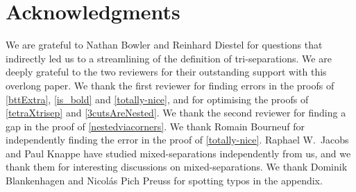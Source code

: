 \documentclass{aic}
\theoremstyle{plain}
\theoremstyle{definition}
\theoremstyle{plain}
\theoremstyle{plain}
\begin{document}
\section*{Acknowledgments} %
We are grateful to Nathan Bowler and Reinhard Diestel for questions that indirectly led us to a streamlining of the definition of tri-separations.
We are deeply grateful to the two reviewers for their outstanding support with this overlong paper.
We thank the first reviewer for finding errors in the proofs of \autoref{bttExtra}, \autoref{is_bold} and \autoref{totally-nice}, and for optimising the proofs of \autoref{tetraXtrisep} and \autoref{3cutsAreNested}.
We thank the second reviewer for finding a gap in the proof of \autoref{nestedviacorners}.
We thank Romain Bourneuf for independently finding the error in the proof of \autoref{totally-nice}.
Raphael W.~Jacobs and Paul Knappe have studied mixed-separations independently from us, and we thank them for interesting discussions on mixed-separations.
We thank Dominik Blankenhagen and Nicolás Pich Preuss for spotting typos in the appendix.
\end{document}
